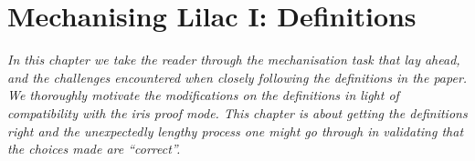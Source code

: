 \chapter{Mechanising Lilac I: Definitions}
\label{sec:definitions}

\emph{In this chapter we take the reader through the mechanisation task that lay ahead, and the challenges encountered when closely following
the definitions in the paper. We thoroughly motivate the modifications on the definitions in light of compatibility with the iris
proof mode. This chapter is about getting the definitions right and the unexpectedly lengthy process one might go through in
validating that the choices made are ``correct''.}




